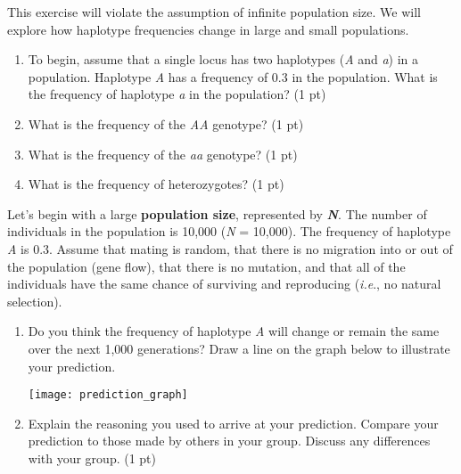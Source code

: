 \documentclass[11pt]{article}
\begin{document}
This exercise will violate the assumption of infinite population size.
We will explore how haplotype frequencies change in large and small
populations.

\begin{enumerate}
\item To begin, assume that a single locus has two haplotypes (\emph{A} and
\emph{a}) in a population. Haplotype \emph{A} has a
frequency of 0.3 in the population. What is the frequency of haplotype
\emph{a} in the population? (1 pt)\vspace{1cm}

\item What is the frequency of the \emph{AA} genotype? (1 pt)\vspace{1cm}

\item What is the frequency of the \emph{aa} genotype? (1 pt)\vspace{1cm}

\item What is the frequency of heterozygotes? (1 pt)\vspace{1cm}

\end{enumerate}

Let's begin with a large \textbf{population size}, represented by
\textbf{\textit{N}}. The number of individuals in the population is 10,000
(\emph{N} = 10,000). The frequency of haplotype \emph{A} is 0.3. Assume
that mating is random, that there is no migration into or out of the
population (gene flow), that there is no mutation, and that all of the
individuals have the same chance of surviving and reproducing
(\emph{i.e}., no natural selection).

\begin{enumerate}[resume]
\item Do you think the frequency of haplotype \emph{A} will change
or remain the same over the next 1,000 generations? Draw a line on the
graph below to illustrate your prediction.

\begin{center}
	\texttt{[image: prediction\_graph]}
\end{center}

\item Explain the reasoning you used to arrive at your prediction.
Compare your prediction to those made by others in your group. Discuss
any differences with your group. (1 pt)

\end{enumerate}
\newpage
\end{document}
